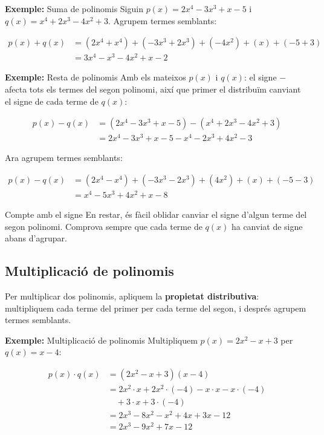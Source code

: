 \begin{exemple}{\textbf{Exemple:} Suma de polinomis}
Siguin $p(x)=2x^4-3x^3+x-5$ i $q(x)=x^4+2x^3-4x^2+3$. Agrupem termes semblants:

\[
\begin{aligned}
p(x)+q(x) &= (2x^4+x^4) + (-3x^3+2x^3) + (-4x^2) + (x) + (-5+3) \\
&= 3x^4 - x^3 - 4x^2 + x - 2
\end{aligned}
\]
\end{exemple}

\begin{exemple}{\textbf{Exemple:} Resta de polinomis}
Amb els mateixos $p(x)$ i $q(x)$: el signe $-$ afecta tots els termes del segon polinomi, així que primer el distribuïm canviant el signe de cada terme de $q(x)$:

\[
\begin{aligned}
p(x)-q(x) &= (2x^4-3x^3+x-5) - (x^4+2x^3-4x^2+3) \\
&= 2x^4-3x^3+x-5 - x^4-2x^3+4x^2-3
\end{aligned}
\]

Ara agrupem termes semblants:

\[
\begin{aligned}
p(x)-q(x) &= (2x^4-x^4) + (-3x^3-2x^3) + (4x^2) + (x) + (-5-3) \\
&= x^4 - 5x^3 + 4x^2 + x - 8
\end{aligned}
\]
\end{exemple}

\begin{nota}{Compte amb el signe}
En restar, és fàcil oblidar canviar el signe d'algun terme del segon polinomi. Comprova sempre que cada terme de $q(x)$ ha canviat de signe abans d'agrupar.
\end{nota}

\subsection{Multiplicació de polinomis}

Per multiplicar dos polinomis, apliquem la \textbf{propietat distributiva}: multipliquem cada terme del primer per cada terme del segon, i després agrupem termes semblants.

\begin{exemple}{\textbf{Exemple:} Multiplicació de polinomis}
Multipliquem $p(x)=2x^2-x+3$ per $q(x)=x-4$:

\[
\begin{aligned}
p(x)\cdot q(x) &= (2x^2-x+3)(x-4) \\
&= 2x^2\cdot x + 2x^2\cdot(-4) - x\cdot x - x\cdot(-4) \\
&\quad + 3\cdot x + 3\cdot(-4) \\
&= 2x^3 - 8x^2 - x^2 + 4x + 3x - 12 \\
&= 2x^3 - 9x^2 + 7x - 12
\end{aligned}
\]
\end{exemple}

